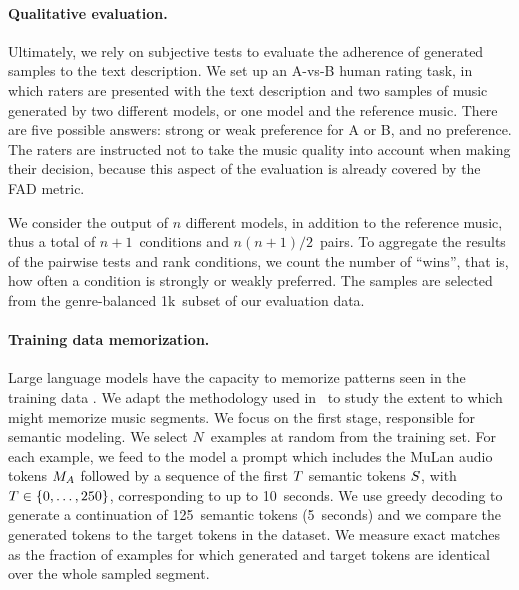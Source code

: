 \paragraph{Qualitative evaluation.}
Ultimately, we rely on subjective tests to evaluate the adherence of generated samples to the text description. We set up an A-vs-B human rating task, in which raters are presented with the text description and two samples of music generated by two different models, or one model and the reference music.
There are five possible answers: strong or weak preference for A or B, and no preference. The raters are instructed not to take the music quality into account when making their decision, because this aspect of the evaluation is already covered by the FAD metric. 

We consider the output of $n$ different models, in addition to the reference music, thus a total of $n+1$~conditions and $n(n+1)/2$~pairs. To aggregate the results of the pairwise tests and rank conditions, we count the number of ``wins'', that is, how often a condition is  strongly or weakly preferred. The samples are selected from the genre-balanced 1k~subset of our evaluation data.

\paragraph{Training data memorization.}
Large language models have the capacity to memorize patterns seen in the training data \cite{trm-extract-train-data}. We adapt the methodology used in~\citet{carlini-memorization} to study the extent to which {\model} might memorize music segments. We focus on the first stage, responsible for semantic modeling. We select $N$~examples at random from the training set. For each example, we feed to the model a prompt which includes the MuLan audio tokens $M_A$ followed by a sequence of the first $T$ semantic tokens $S$, with $T \in \{0,\ldots,250\}$, corresponding to up to 10~seconds. We use greedy decoding to generate a continuation of 125~semantic tokens (5~seconds) and we compare the generated tokens to the target tokens in the dataset. 
We measure exact matches as the fraction of examples for which generated and target tokens are identical over the whole sampled segment. 

